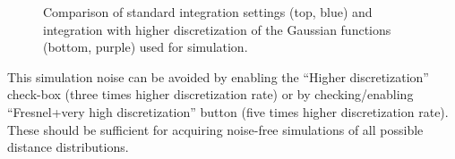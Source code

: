 \documentclass[pdftex,bezier,german,a4,twoside, headexclude,12pt,nochapterprefix, titlepage]{extarticle}
\newcommand{\figspace}{\hspace{0.5cm}}
\begin{document}
\begin{figure}[!htb]
     \figspace
    \caption{Comparison of standard integration settings (top, blue) and integration with higher discretization of the Gaussian
    functions (bottom, purple) used for simulation.
    }
\label{Integration_mehtods_comparison}
\end{figure} 
This simulation noise  can be avoided by enabling the ``Higher discretization'' check-box (three times higher discretization rate) or by checking/enabling
``Fresnel+very high discretization'' button (five times higher discretization rate). These should be sufficient for acquiring noise-free
simulations of all possible distance distributions.

\newpage
\end{document}
